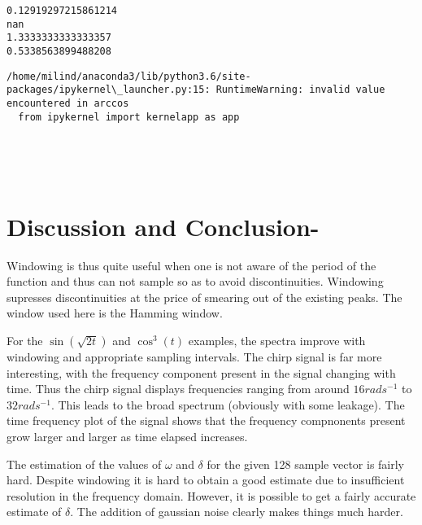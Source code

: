 \documentclass[a4paper, 12pt, margin= 1.25cm]{article}
\begin{document}
    \begin{Verbatim}[commandchars=\\\{\}]
0.12919297215861214
nan
1.3333333333333357
0.5338563899488208

    \end{Verbatim}

    \begin{Verbatim}[commandchars=\\\{\}]
/home/milind/anaconda3/lib/python3.6/site-packages/ipykernel\_launcher.py:15: RuntimeWarning: invalid value encountered in arccos
  from ipykernel import kernelapp as app

    \end{Verbatim}

    \begin{center}
    \end{center}
    { \hspace*{\fill} \\}
    
    \begin{center}
    \end{center}
    { \hspace*{\fill} \\}
    
    \section{Discussion and Conclusion-}\label{discussion-and-conclusion-}

Windowing is thus quite useful when one is not aware of the period of
the function and thus can not sample so as to avoid discontinuities.
Windowing supresses discontinuities at the price of smearing out of the
existing peaks. The window used here is the Hamming window.

For the \(\sin(\sqrt{2t})\) and \(\cos^3(t)\) examples, the spectra
improve with windowing and appropriate sampling intervals. The chirp
signal is far more interesting, with the frequency component present in
the signal changing with time. Thus the chirp signal displays
frequencies ranging from around \(16 rad s^{-1}\) to \(32 rad s^{-1}\).
This leads to the broad spectrum (obviously with some leakage). The time
frequency plot of the signal shows that the frequency compnonents
present grow larger and larger as time elapsed increases.

The estimation of the values of \(\omega\) and \(\delta\) for the given
128 sample vector is fairly hard. Despite windowing it is hard to obtain
a good estimate due to insufficient resolution in the frequency domain.
However, it is possible to get a fairly accurate estimate of \(\delta\).
The addition of gaussian noise clearly makes things much harder.


    
    
    
    
\end{document}
